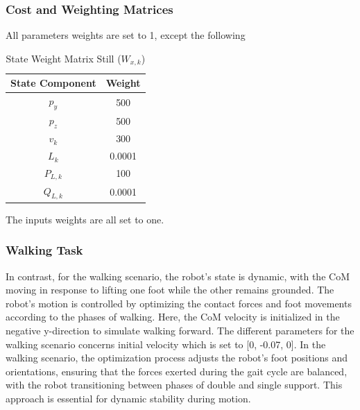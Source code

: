 \documentclass[main.tex]{subfiles}
\begin{document}
\subsubsection*{Cost and Weighting Matrices}
All parameters weights are set to 1, except the following
\begin{table}[H]
\centering
\renewcommand{\arraystretch}{1.5} %
\begin{tabular}{|c|c|}
\hline
\textbf{State Component} & \textbf{Weight} \\ \hline
\(p_y\) & 500 \\ \hline
\(p_z\) & 500 \\ \hline
\(v_k\) & 300 \\ \hline
\(L_k\) & 0.0001 \\ \hline
\(P_{L,k}\) & 100 \\ \hline
\(Q_{L,k}\) & 0.0001 \\ \hline
\end{tabular}
\caption{State Weight Matrix Still (\(W_{x,k}\))}
\label{tab:state_weights_still}
\end{table}

The inputs weights are all set to one. 

\subsubsection*{Walking Task}

In contrast, for the walking scenario, the robot's state is dynamic, with the CoM moving in response to lifting one foot while the other remains grounded. The robot's motion is controlled by optimizing the contact forces and foot movements according to the phases of walking. Here, the CoM velocity is initialized in the negative y-direction to simulate walking forward.
The different parameters for the walking scenario concerns initial velocity which is set to [0, -0.07, 0].
In the walking scenario, the optimization process adjusts the robot's foot positions and orientations, ensuring that the forces exerted during the gait cycle are balanced, with the robot transitioning between phases of double and single support. This approach is essential for dynamic stability during motion.
\end{document}
